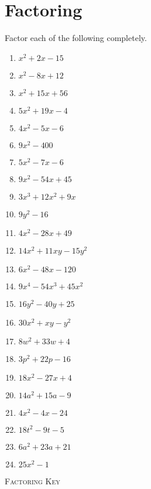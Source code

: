 \chapter{Factoring}

Factor each of the following completely.

\begin{multicols}{4}
\begin{enumerate}
\item $x^2 + 2x - 15$
\item $x^2 - 8x + 12$
\item $x^2 + 15x + 56$
\item $5x^2 + 19x - 4$
\item $4x^2 - 5x - 6$
\item $9x^2 - 400$
\item $5x^2-7x-6$
\item $9x^2-54x+45$
\item $3x^3+12x^2+9x$
\item $9y^2-16$
\item $4x^2-28x+49$
\item $14x^2+11xy-15y^2$
\item $6x^2-48x-120$
\item $9x^4-54x^3+45x^2$
\item $16y^2-40y+25$
\item $30x^2+xy-y^2$
\item $8w^2 + 33w + 4$
\item $3p^2+22p-16$
\item $18x^2-27x+4$
\item $14a^2+15a-9$
\item $4x^2-4x-24$
\item $18t^2-9t-5$
\item $6a^2 + 23a + 21$
\item $25x^2-1$
\end{enumerate}
\end{multicols}

\newpage

\textsc{Factoring Key}

